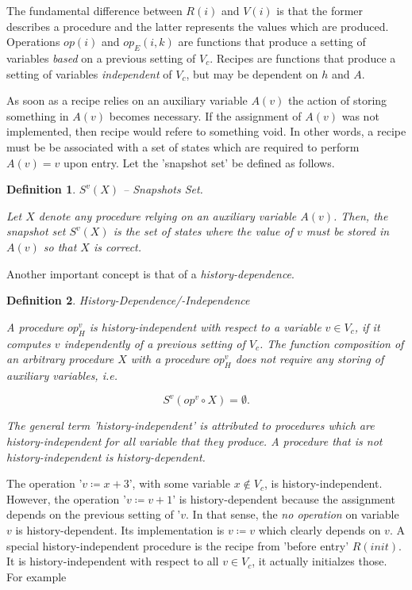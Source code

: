 \documentclass[12pt,a4paper]{scrartcl}
\newtheorem{definition}{Definition}
\begin{document}
The fundamental difference between $R(i)$ and $V(i)$ is that the former
describes a procedure and the latter represents the values which are produced.
Operations $op(i)$ and $op_E(i,k)$ are functions that produce a setting of
variables \textit{based} on a previous setting of $V_c$.  Recipes are functions
that produce a setting of variables \textit{independent} of $V_c$, but may be
dependent on $h$ and $A$.

As soon as a recipe relies on an auxiliary variable $A(v)$ the action of
storing something in $A(v)$ becomes necessary. If the assignment of $A(v)$ was
not implemented, then recipe would refere to something void. In other words, a
recipe must be be associated with a set of states which are required to perform
$A(v)=v$ upon entry. Let the 'snapshot set' be defined as follows.

\begin{definition} $S^v(X)$ -- Snapshots Set.

    Let $X$ denote any procedure relying on an auxiliary variable $A(v)$.
    Then, the \textit{snapshot set} $S^v(X)$ is the set of states where the
    value of $v$ must be stored in $A(v)$ so that $X$ is correct. 

\end{definition}

Another important concept is that of a \textit{history-dependence}.

\begin{definition} History-Dependence/-Independence

    A procedure $op^v_H$ is history-independent with respect to a variable $v\in V_c$,
    if it computes $v$ independently of a previous setting of $V_c$.  The function
    composition of an arbitrary procedure $X$ with a procedure $op^v_H$ does not
    require any storing of auxiliary variables, i.e.

    \begin{equation}
        S^v(op^v\circ X) = \emptyset.
    \end{equation}
    
    The general term 'history-independent' is attributed to procedures which
    are history-independent for all variable that they produce.  A procedure
    that is not history-independent is history-dependent.

\end{definition}

The operation '$v\coloneqq x+3$', with some variable $x\notin V_c$, is
history-independent.  However, the operation '$v\coloneqq v+1$' is
history-dependent because the assignment depends on the previous setting of
'$v$. In that sense, the \textit{no operation} on variable $v$ is
history-dependent. Its implementation is $v\coloneqq v$ which clearly depends
on $v$.  A special history-independent procedure is the recipe from 'before
entry' $R(init)$. It is history-independent with respect to all $v\in V_c$, it
actually initialzes those. For example
\end{document}
